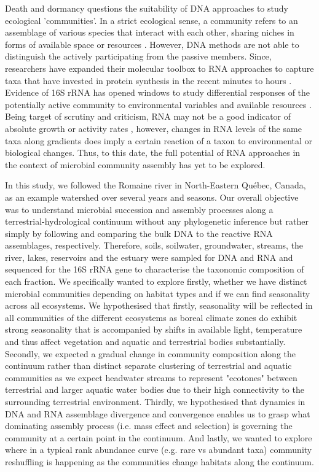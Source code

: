 \documentclass[12pt,a4paper]{article} %
\begin{document}
Death and dormancy \citep{Cole1999, Jones2010} questions the suitability of DNA approaches to study ecological 'communities'. In a strict ecological sense, a community refers to an assemblage of various species that interact with each other, sharing niches in forms of available space or resources \citep{Konopka2009}. However, DNA methods are not able to distinguish the actively participating from the passive members. Since, researchers have expanded their molecular toolbox to RNA approaches to capture taxa that have invested in protein synthesis in the recent minutes to hours \citep{Blazewicz2013}. Evidence of 16S rRNA has opened windows to study differential responses of the potentially active community to environmental variables and available resources \citep{Osterholz2016}. Being target of scrutiny and criticism, RNA may not be a good indicator of absolute growth or activity rates \citep{Blazewicz2013}, however, changes in RNA levels of the same taxa along gradients does imply a certain reaction of a taxon to environmental or biological changes. Thus, to this date, the full potential of RNA approaches in the context of microbial community assembly has yet to be explored.

In this study, we followed the Romaine river in North-Eastern Qu\'{e}bec, Canada, as an example watershed over several years and seasons. Our overall objective was to understand microbial succession and assembly processes along a terrestrial-hydrological continuum without any phylogenetic inference but rather simply by following and comparing the bulk DNA to the reactive RNA assemblages, respectively. Therefore, soils, soilwater, groundwater, streams, the river, lakes, reservoirs and the estuary were sampled for DNA and RNA and sequenced for the 16S rRNA gene to characterise the taxonomic composition of each fraction. We specifically wanted to explore firstly, whether we have distinct microbial communities depending on habitat types and if we can find seasonality across all ecosystems. We hypothesised that firstly, seasonality will be reflected in all communities of the different ecosystems as boreal climate zones do exhibit strong seasonality that is accompanied by shifts in available light, temperature and thus affect vegetation and aquatic and terrestrial bodies substantially. Secondly, we expected a gradual change in community composition along the continuum rather than distinct separate clustering of terrestrial and aquatic communities as we expect headwater streams to represent "ecotones" between terrestrial and larger aquatic water bodies due to their high connectivity to the surrounding terrestrial environment. Thirdly, we hypothesised that dynamics in DNA and RNA assemblage divergence and convergence enables us to grasp what dominating assembly process (i.e. mass effect and selection) is governing the community at a certain point in the continuum. And lastly, we wanted to explore where in a typical rank abundance curve (e.g. rare vs abundant taxa) community reshuffling is happening as the communities change habitats along the continuum.
\end{document}
